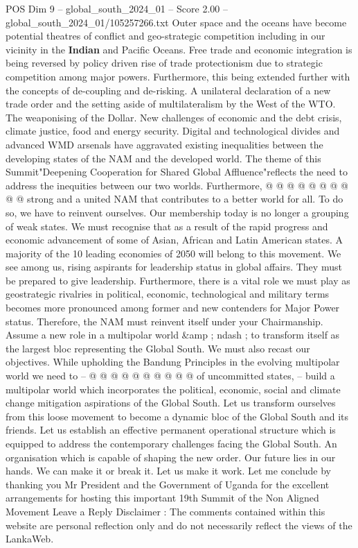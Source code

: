 \begin{textsample}{POS Dim 9 – global\_south\_2024\_01 – Score 2.00 – global\_south\_2024\_01/105257266.txt}
Outer space and the oceans have become potential theatres of conflict and geo-strategic competition including in our vicinity in the \textbf{Indian} and Pacific Oceans.
Free trade and economic integration is being reversed by policy driven rise of trade protectionism due to strategic competition among major powers.
Furthermore, this being extended further with the concepts of de-coupling and de-risking.
A unilateral declaration of a new trade order and the setting aside of multilateralism by the West of the WTO.
The weaponising of the Dollar.
New challenges of economic and the debt crisis, climate justice, food and energy security.
Digital and technological divides and advanced WMD arsenals have aggravated existing inequalities between the developing states of the NAM and the developed world.
The theme of this Summit"Deepening Cooperation for Shared Global Affluence"reflects the need to address the inequities between our two worlds.
Furthermore, @ @ @ @ @ @ @ @ @ @ strong and a united NAM that contributes to a better world for all.
To do so, we have to reinvent ourselves.
Our membership today is no longer a grouping of weak states.
We must recognise that as a result of the rapid progress and economic advancement of some of Asian, African and Latin American states.
A majority of the 10 leading economies of 2050 will belong to this movement.
We see among us, rising aspirants for leadership status in global affairs.
They must be prepared to give leadership.
Furthermore, there is a vital role we must play as geostrategic rivalries in political, economic, technological and military terms becomes more pronounced among former and new contenders for Major Power status.
Therefore, the NAM must reinvent itself under your Chairmanship.
Assume a new role in a multipolar world \&amp ; ndash ; to transform itself as the largest bloc representing the Global South.
We must also recast our objectives.
While upholding the Bandung Principles in the evolving multipolar world we need to -- @ @ @ @ @ @ @ @ @ @ of uncommitted states, -- build a multipolar world which incorporates the political, economic, social and climate change mitigation aspirations of the Global South.
Let us transform ourselves from this loose movement to become a dynamic bloc of the Global South and its friends.
Let us establish an effective permanent operational structure which is equipped to address the contemporary challenges facing the Global South.
An organisation which is capable of shaping the new order.
Our future lies in our hands.
We can make it or break it.
Let us make it work.
Let me conclude by thanking you Mr President and the Government of Uganda for the excellent arrangements for hosting this important 19th Summit of the Non Aligned Movement Leave a Reply Disclaimer : The comments contained within this website are personal reflection only and do not necessarily reflect the views of the LankaWeb.

\end{textsample}
